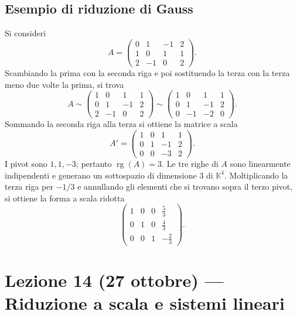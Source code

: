 \documentclass[11pt,a4paper]{article}
\newcommand{\KK}{\mathbb{K}}
\theoremstyle{plain}
\theoremstyle{definition}
\theoremstyle{remark}
\begin{document}
\subsection{Esempio di riduzione di Gauss}
Si consideri
\[
 A=\begin{pmatrix}
 0&1&-1&2\\
 1&0&1&1\\
 2&-1&0&2
 \end{pmatrix}.
\]
Scambiando la prima con la seconda riga e poi sostituendo la terza con la terza meno due volte la prima, si trova
\[
 A\sim
 \begin{pmatrix}1&0&1&1\\0&1&-1&2\\2&-1&0&2\end{pmatrix}
 \sim
 \begin{pmatrix}1&0&1&1\\0&1&-1&2\\0&-1&-2&0\end{pmatrix}.
\]
Sommando la seconda riga alla terza si ottiene la matrice a scala
\[
 A' =\begin{pmatrix}1&0&1&1\\0&1&-1&2\\0&0&-3&2\end{pmatrix}.
\]
I pivot sono $1,1,-3$; pertanto $\operatorname{rg}(A)=3$. Le tre righe di $A$ sono linearmente indipendenti e generano un sottospazio di dimensione $3$ di $\KK^4$. Moltiplicando la terza riga per $-1/3$ e annullando gli elementi che si trovano sopra il terzo pivot, si ottiene la forma a scala ridotta
\[
 \begin{pmatrix}1&0&0&\frac53\\0&1&0&\frac43\\0&0&1&-\frac23\end{pmatrix}.
\]

\section{Lezione 14 (27 ottobre) --- Riduzione a scala e sistemi lineari}
\end{document}

